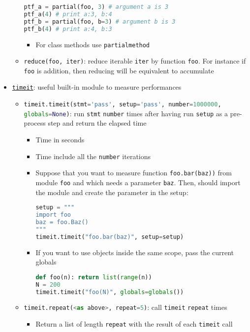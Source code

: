 \documentclass[a4paper,12pt,%
              final%
              ]{article}
\begin{document}
\begin{itemize}
\begin{itemize}
\begin{lstlisting}[language=python]
ptf_a = partial(foo, 3) # argument a is 3
ptf_a(4) # print a:3, b:4
ptf_b = partial(foo, b=3) # argument b is 3
ptf_b(4) # print a:4, b:3
\end{lstlisting}
        \begin{itemize}
          \item For class methods use \texttt{partialmethod}
        \end{itemize}
      \item \verb|reduce(foo, iter)|: reduce iterable \texttt{iter} by function \texttt{foo}. For instance if \texttt{foo} is addition, then reducing will be equivalent to accumulate
    \end{itemize}
  \item \href{https://docs.python.org/3/library/timeit.html}{\texttt{timeit}}: useful built-in module to measure performances
    \begin{itemize}
      \item \lstinline[language=python]{timeit.timeit(stmt='pass', setup='pass', number=1000000, globals=None)}: run \texttt{stmt} \texttt{number} times after having run \texttt{setup} as a pre-process step and return the elapsed time
        \begin{itemize}
          \item Time in seconds
          \item Time include all the \texttt{number} iterations
          \item Suppose that you want to measure function \lstinline[language=python]{foo.bar(baz))} from module \texttt{foo} and which needs a parameter \texttt{baz}. Then, should import the module and create the parameter in the setup:
\begin{lstlisting}[language=python]
setup = """
import foo
baz = foo.Baz()
"""
timeit.timeit("foo.bar(baz)", setup=setup)
\end{lstlisting}
          \item If you want to use objects inside the same scope, pass the current globals
\begin{lstlisting}[language=python]
def foo(n): return list(range(n))
N = 200
timeit.timeit("foo(N)", globals=globals())
\end{lstlisting}
        \end{itemize}
      \item \lstinline[language=python]{timeit.repeat(<as above>, repeat=5)}: call \texttt{timeit} \texttt{repeat} times
        \begin{itemize}
          \item Return a list of length \texttt{repeat} with the result of each \texttt{timeit} call

\end{itemize}
\end{itemize}
\end{itemize}
\end{document}
